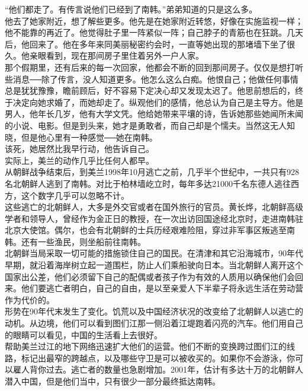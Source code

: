 “他们都走了。有传言说他们已经到了南韩。”弟弟知道的只是这么多。\\

他去了她家附近，想了解些更多。他先是在她家附近转悠，好像在实施监视一样；他不能靠的再近了。他觉得肚子里一阵紧似一阵；自己脖子的青筋也在狂跳。几天后，他回来了。他在多年来同美丽秘密约会时，一直等她出现的那堵墙下坐了很久。他亲眼看到，现在那间房子里住着另外一户人家。\\

那个假期里，还有后来的每一次回家，他都会不断的回到那间房子。仅仅是想打听些消息──除了传言，没人知道更多。他怎么这么白痴。他恨自己；他做任何事情总是犹犹豫豫，瞻前顾后，好不容易下定决心却又发现太迟了。他思前想后的，终于决定向她求婚了，而她却走了。纵观他们的感情，他总认为自己是主导方。他是男人，他年长几岁，他有大学文凭。他给她带来平壤的诗，告诉她那些她闻所未闻的小说、电影。但是到头来，她才是勇敢者，而自己却是个懦夫。当然这无人知晓，但是他心里有一种感觉──她在南韩。\\

该死，她居然比我早行动，他告诉自己。\\

实际上，美兰的动作几乎比任何人都早。\\

从朝鲜战争结束后，到美兰1998年10月逃亡之前，几乎半个世纪中，一共只有928名北朝鲜人逃到了南韩。对比于柏林墙屹立时，每年多达21000千名东德人逃往西方，这个数字几乎可以忽略不计。\\

这些逃亡的北朝鲜人，大多是外交官或者在国外旅行的官员。黄长烨，北朝鲜高级学者和领导人，曾经作为金正日的教授，在一次出访回国途经北京时，走进南韩驻北京大使馆。偶尔，也会有北朝鲜的士兵历经艰难险阻，穿过非军事区叛逃至南韩。还有一些渔民，则坐船前往南韩。\\

北朝鲜当局采取一切可能的措施锁住自己的国民。在清津和其它沿海城市，90年代早期，就沿着海岸树立起一道围栏，防止人们乘船驶向日本。当北朝鲜人离开这个国家出公差，他们必须留下自己的配偶或者孩子作为有效的人质用以确保他们会回来。他们要逃亡者明白，自己的自由，是以至亲爱人下半辈子将永远生活在劳动营作为代价的。\\

形势在90年代末发生了变化。饥荒以及中国经济状况的改变给了北朝鲜人以逃亡的动机。从边境，他们可以看到图们江那一侧沿着江堤跑着闪亮的汽车。他们用自己的眼睛可以看见，中国的生活看上去很好。\\

帮助美兰过江的地下网络迅速扩大他们的运营。他们不断的变换跨过图们江的线路，标记出最窄的跨越点，以及哪些守卫是可以被收买的。如果你不会游泳，你可以雇人背你过去。逃亡者的数量也急剧增加。2001年，估计有多达十万的北朝鲜人潜入中国，但是他们当中，只有很少一部分最终抵达南韩。\\

